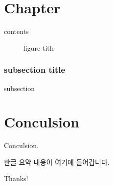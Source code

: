 \documentclass[oneside,phd]{snuthesis_utf8}
\begin{document}
\chapter{Chapter}

contents

\begin{figure}[!hbp]
\caption{figure title}
\end{figure}

\subsection{subsection title}
subsection



\chapter{Conculsion}
Conculsion.


\begin{bibpage}
	
	
\end{bibpage}



\begin{abstractalt}
한글 요약 내용이 여기에 들어갑니다.
\end{abstractalt}

\acknowledgement
Thanks!
\end{document}

